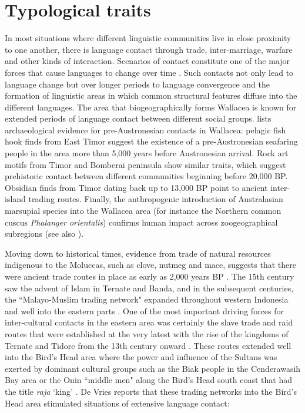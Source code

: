 \section{Typological traits}\label{sec:typo}
In most situations where different linguistic communities live in close proximity to one another, there is language contact through trade, inter-marriage, warfare and other kinds of interaction. Scenarios of contact constitute one of the major forces that cause languages to change over time \citep{thomason2001language}. Such contacts not only lead to language change but over longer periods to language convergence and the formation of linguistic areas in which common structural features diffuse into the different languages. The area that biogeographically forms Wallacea is known for extended periods of language contact between different social groups. \citet[141f.]{schapper2015wallacea} lists archaeological evidence for pre-Austronesian contacts in Wallacea: pelagic fish hook finds from East Timor suggest the existence of a pre-Austronesian seafaring people in the area more than 5,000 years before Austronesian arrival. Rock art motifs from Timor and Bomberai peninsula show similar traits, which suggest prehistoric contact between different communities beginning before 20,000 BP. Obsidian finds from Timor dating back up to 13,000 BP point to ancient inter-island trading routes. Finally, the anthropogenic introduction of Australasian marsupial species into the Wallacea area (for instance the Northern common cuscus \textit{Phalanger orientalis}) confirms human impact across zoogeographical subregions (see also \citealt{Heinsohn2010}).

Moving down to historical times, evidence from trade of natural resources indigenous to the Moluccas, such as clove, nutmeg and mace, suggests that there were ancient trade routes in place as early as 2,000 years BP \citep{klamer2008east}. The 15th century saw the advent of Islam in Ternate and Banda, and in the subsequent centuries, the ``Malayo-Muslim trading network" expanded throughout western Indonesia and well into the eastern parts \citep{klamer2008east}. One of the most important driving forces for inter-cultural contacts in the eastern area was certainly the slave trade and raid routes that were established at the very latest with the rise of the kingdoms of Ternate and Tidore from the 13th century onward \citep{klamer2008east}. These routes extended well into the Bird's Head area where the power and influence of the Sultans was exerted by dominant cultural groups such as the Biak people in the Cenderawasih Bay area \citep[2]{vanheuvel2006} or the Onin ``middle men" along the Bird's Head south coast that had the title \textit{raja} `king' \citep[2]{devries2004}. De Vries reports that these trading networks into the Bird's Head area stimulated situations of extensive language contact:

